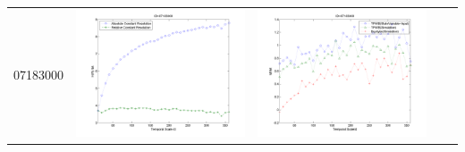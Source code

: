 \documentclass[11pt]{article}
\begin{document}
\begin{table}[H]
{\begin{tabular}{c  c   c   c  c }
07183000&\begin{minipage}{.4\textwidth}\includegraphics[width=\linewidth]{resultgraph/07183000e.png}\end{minipage}
&\begin{minipage}{.4\textwidth}\includegraphics[width=\linewidth]{resultgraph/07183000MI.png}\end{minipage}

\end{tabular}}
\end{table}
\end{document}
